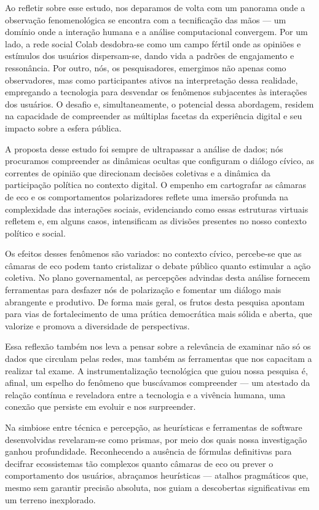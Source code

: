 Ao refletir sobre esse estudo, nos deparamos de volta com um panorama onde a observação fenomenológica se encontra com a tecnificação das mãos — um domínio onde a interação humana e a análise computacional convergem. Por um lado, a rede social Colab desdobra-se como um campo fértil onde as opiniões e estímulos dos usuários dispersam-se, dando vida a padrões de engajamento e ressonância. Por outro, nós, os pesquisadores, emergimos não apenas como observadores, mas como participantes ativos na interpretação dessa realidade, empregando a tecnologia para desvendar os fenômenos subjacentes às interações dos usuários. O desafio e, simultaneamente, o potencial dessa abordagem, residem na capacidade de compreender as múltiplas facetas da experiência digital e seu impacto sobre a esfera pública.

A proposta desse estudo foi sempre de ultrapassar a análise de dados; nós procuramos compreender as dinâmicas ocultas que configuram o diálogo cívico, as correntes de opinião que direcionam decisões coletivas e a dinâmica da participação política no contexto digital. O empenho em cartografar as câmaras de eco e os comportamentos polarizadores reflete uma imersão profunda na complexidade das interações sociais, evidenciando como essas estruturas virtuais refletem e, em alguns casos, intensificam as divisões presentes no nosso contexto político e social.

Os efeitos desses fenômenos são variados: no contexto cívico, percebe-se que as câmaras de eco podem tanto cristalizar o debate público quanto estimular a ação coletiva. No plano governamental, as percepções advindas desta análise fornecem ferramentas para desfazer nós de polarização e fomentar um diálogo mais abrangente e produtivo. De forma mais geral, os frutos desta pesquisa apontam para vias de fortalecimento de uma prática democrática mais sólida e aberta, que valorize e promova a diversidade de perspectivas.

Essa reflexão também nos leva a pensar sobre a relevância de examinar não só os dados que circulam pelas redes, mas também as ferramentas que nos capacitam a realizar tal exame. A instrumentalização tecnológica que guiou nossa pesquisa é, afinal, um espelho do fenômeno que buscávamos compreender — um atestado da relação contínua e reveladora entre a tecnologia e a vivência humana, uma conexão que persiste em evoluir e nos surpreender.

Na simbiose entre técnica e percepção, as heurísticas e ferramentas de software desenvolvidas revelaram-se como prismas, por meio dos quais nossa investigação ganhou profundidade. Reconhecendo a ausência de fórmulas definitivas para decifrar ecossistemas tão complexos quanto câmaras de eco ou prever o comportamento dos usuários, abraçamos heurísticas — atalhos pragmáticos que, mesmo sem garantir precisão absoluta, nos guiam a descobertas significativas em um terreno inexplorado.


